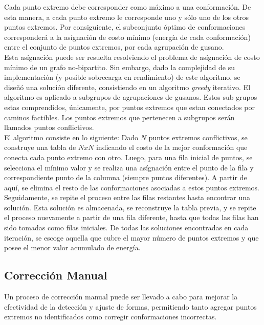 Cada punto extremo debe corresponder como m\'aximo a una conformaci\'on. De esta
manera, a cada punto extremo le corresponde uno y s\'olo uno de los otros puntos extremos.
Por consiguiente, el subconjunto \'optimo de conformaciones corresponder\'a a la
as\'ignaci\'on de costo m\'inimo (energ\'ia de cada conformaci\'on) entre el 
conjunto de puntos extremos, por cada agrupaci\'on de gusano.\\

Esta as\'ignaci\'on puede ser resuelta resolviendo el problema de as\'ignaci\'on de
costo m\'inimo de un grafo no-bipartito. Sin embargo, dado la complejidad de
su implementaci\'on (y posible sobrecarga en rendimiento) de este algoritmo,
se dise\~n\'o una soluci\'on diferente, consistiendo en un algoritmo \emph{greedy}
iterativo. El algoritmo es aplicado a subgrupos de agrupaciones de gusanos.
Estos sub grupos estas comprendidos, \'unicamente, por puntos extremos que estan
conectados por caminos factibles. Los puntos extremos que pertenecen a subgrupos
ser\'an llamados puntos conflictivos.\\

El algoritmo consiste en lo siguiente: Dado $N$ puntos extremos conflictivos, se
construye una tabla de $NxN$ indicando el costo de la mejor conformaci\'on que 
conecta cada punto extremo con otro. Luego, para una fila inicial de puntos,
se selecciona el m\'inimo valor y se realiza una as\'ignaci\'on entre el punto
de la fila y correspondiente punto de la columna (siempre puntos diferentes).
A partir de aqu\'i, se elimina el resto de las conformaciones asociadas
a estos puntos extremos. Seguidamente, se repite el proceso entre las filas
restantes hasta encontrar una soluci\'on. Esta soluci\'on es almacenada, 
se reconstruye la tabla previa, y se repite el proceso nuevamente a partir
de una fila diferente, hasta que todas las filas han sido tomadas como
filas iniciales. De todas las soluciones encontradas en cada iteraci\'on,
se escoge aquella que cubre el mayor n\'umero de puntos extremos y que
posee el menor valor acumulado de energ\'ia.

\subsection{Correcci\'on Manual}
\label{sec:manualproc}

Un proceso de correcci\'on manual puede ser llevado a cabo para mejorar la efectividad
de la detecci\'on y ajuste de formas, permitiendo tanto agregar puntos extremos 
no identificados como corregir conformaciones incorrectas.

